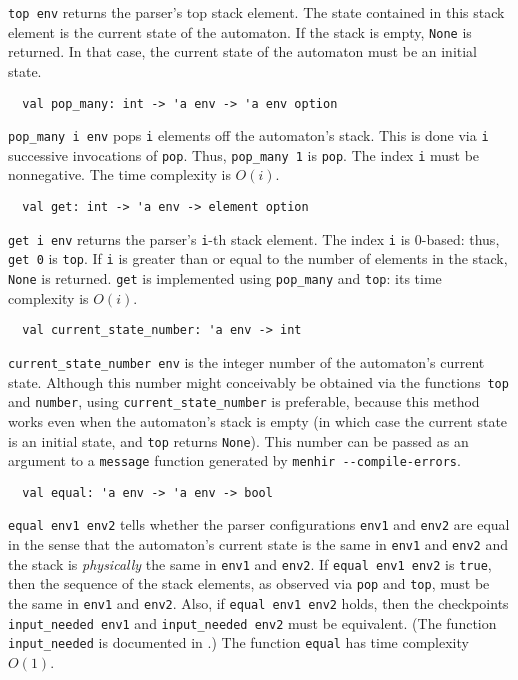 \documentclass[onecolumn,11pt,nocopyrightspace,preprint]{sigplanconf}
\begin{document}
\verb+top env+ returns the parser's top stack element. The state contained in
this stack element is the current state of the automaton. If the stack is
empty, \verb+None+ is returned. In that case, the current state of the
automaton must be an initial state.


\begin{verbatim}
  val pop_many: int -> 'a env -> 'a env option
\end{verbatim}

\verb+pop_many i env+ pops \verb+i+ elements off the automaton's stack. This
is done via \verb+i+ successive invocations of \verb+pop+. Thus,
\verb+pop_many 1+ is \verb+pop+. The index \verb+i+ must be nonnegative. The
time complexity is $O(i)$.


\begin{verbatim}
  val get: int -> 'a env -> element option
\end{verbatim}

\verb+get i env+ returns the parser's \verb+i+-th stack element. The index
\verb+i+ is 0-based: thus, \verb+get 0+ is \verb+top+. If \verb+i+ is greater
than or equal to the number of elements in the stack, \verb+None+ is returned.
\verb+get+ is implemented using \verb+pop_many+ and \verb+top+: its time
complexity is $O(i)$.


\begin{verbatim}
  val current_state_number: 'a env -> int
\end{verbatim}

\verb+current_state_number env+ is the integer number of the automaton's
current state. Although this number might conceivably be obtained via the
functions~\verb+top+ and \verb+number+, using \verb+current_state_number+ is
preferable, because this method works even when the automaton's stack is empty
(in which case the current state is an initial state, and \verb+top+ returns
\verb+None+). This number can be passed as an argument to a \verb+message+
function generated by \verb+menhir --compile-errors+.


\begin{verbatim}
  val equal: 'a env -> 'a env -> bool
\end{verbatim}

\verb+equal env1 env2+ tells whether the parser configurations \verb+env1+ and
\verb+env2+ are equal in the sense that the automaton's current state is the
same in \verb+env1+ and \verb+env2+ and the stack is \emph{physically} the
same in \verb+env1+ and \verb+env2+. If \verb+equal env1 env2+ is \verb+true+,
then the sequence of the stack elements, as observed via \verb+pop+ and
\verb+top+, must be the same in \verb+env1+ and \verb+env2+. Also, if
\verb+equal env1 env2+ holds, then the checkpoints \verb+input_needed env1+
and \verb+input_needed env2+ must be equivalent. (The function
\verb+input_needed+ is documented in .)
The function \verb+equal+ has time complexity $O(1)$.
\end{document}
